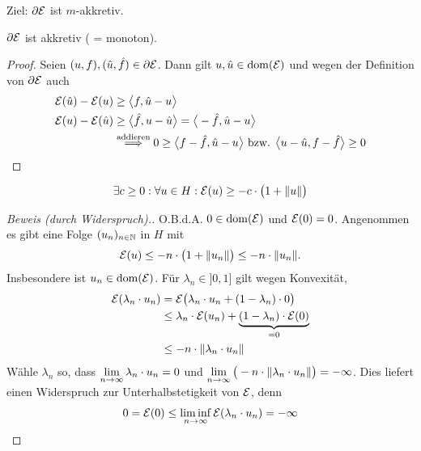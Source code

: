Ziel: $\partial\mathcal{E}$ ist $m$-akkretiv.

\begin{lemma}\label{lemmaSubgradientistAkkretiv}
	$\partial\mathcal{E}$ ist akkretiv ( = monoton).
\end{lemma}

\begin{proof}
	Seien $(u,f),(\hat{u},\hat{f})\in\partial\mathcal{E}$. 
	Dann gilt $u,\hat{u}\in\operatorname{dom}(\mathcal{E})$ und wegen der Definition von $\partial\mathcal{E}$ auch
	\begin{align*}
		\mathcal{E}(\hat{u})-\mathcal{E}(u)&\geq\big\langle f,\hat{u}-u\big\rangle\\
		\mathcal{E}(u)-\mathcal{E}(\hat{u})&\geq\big\langle \hat{f},u-\hat{u}\big\rangle=\big\langle-\hat{f},\hat{u}-u\big\rangle\\
		&\stackrel{\text{addieren}}{\implies}
		0\geq\big\langle f-\hat{f},\hat{u}-u\big\rangle
		\text{ bzw. }
		\big\langle u-\hat{u},f-\hat{f}\big\rangle\geq0
	\end{align*}
\end{proof}

\begin{lemma}\label{lemma1.3.2}
	\begin{align*}
		\exists c\geq0:\forall u\in H:\mathcal{E}(u)\geq -c\cdot\big(1+\Vert u\Vert\big)
	\end{align*}
\end{lemma}

\begin{proof}[Beweis (durch Widerspruch).]\enter
	O.B.d.A. $0\in\operatorname{dom}(\mathcal{E})$ und $\mathcal{E}(0)=0$. 
	Angenommen es gibt eine Folge $(u_n)_{n\in\mathbb{N}}$ in $H$ mit
	\begin{align*}
		\mathcal{E}(u)\leq -n\cdot\big(1+\Vert u_n\Vert\big)\leq -n\cdot\Vert u_n\Vert.
	\end{align*}
	Insbesondere ist $u_n\in\operatorname{dom}(\mathcal{E})$. 
	Für $\lambda_n\in]0,1]$ gilt wegen Konvexität,
	\begin{align*}
		\mathcal{E}(\lambda_n\cdot u_n)
		&=\mathcal{E}\big(\lambda_n\cdot u_n+(1-\lambda_n)\cdot 0\big)\\
		&\leq\lambda_n\cdot\mathcal{E}(u_n)+\underbrace{(1-\lambda_n)\cdot\mathcal{E}(0)}_{=0}\\
		&\leq- n\cdot\Vert\lambda_n\cdot u_n\Vert
	\end{align*}
	Wähle $\lambda_n$ so, dass $\lim\limits_{n\to\infty}\lambda_n\cdot u_n=0$ und $\lim\limits_{n\to\infty}\big(-n\cdot\Vert\lambda_n\cdot u_n\Vert\big)=-\infty$. 
	Dies liefert einen Widerspruch zur Unterhalbstetigkeit von $\mathcal{E}$, denn
	\begin{align*}
		0=\mathcal{E}(0)\leq\liminf\limits_{n\to\infty}\mathcal{E}(\lambda_n\cdot u_n)=-\infty
	\end{align*}
\end{proof}

